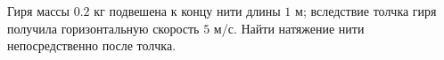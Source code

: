 Гиря массы $0.2$ кг подвешена к концу нити длины $1$ м;
вследствие толчка гиря получила горизонтальную скорость $5$ м/с.
Найти натяжение нити непосредственно после толчка.
